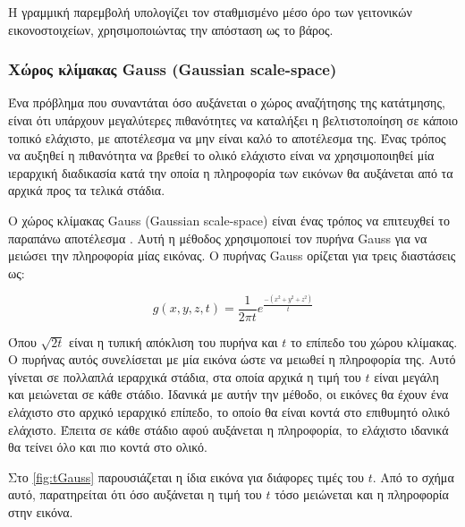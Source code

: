 \documentclass[a4paper,12pt]{article}
\begin{document}
Η γραμμική παρεμβολή υπολογίζει τον σταθμισμένο μέσο όρο των γειτονικών
εικονοστοιχείων, χρησιμοποιώντας την απόσταση ως το βάρος.

\subsubsection{Χώρος κλίμακας Gauss (Gaussian scale-space)} \label{reg:gauss:1}

Ένα πρόβλημα που συναντάται όσο αυξάνεται ο χώρος αναζήτησης της κατάτμησης,
είναι ότι υπάρχουν μεγαλύτερες πιθανότητες να καταλήξει η βελτιστοποίηση σε
κάποιο τοπικό ελάχιστο, με αποτέλεσμα να μην είναι καλό το αποτέλεσμα της. Ένας
τρόπος να αυξηθεί η πιθανότητα να βρεθεί το ολικό ελάχιστο είναι να
χρησιμοποιηθεί μία ιεραρχική διαδικασία κατά την οποία η πληροφορία των εικόνων
θα αυξάνεται από τα αρχικά προς τα τελικά στάδια. 

Ο χώρος κλίμακας Gauss (Gaussian scale-space) είναι ένας τρόπος να επιτευχθεί το
παραπάνω αποτέλεσμα \cite{scale_space:1}. Αυτή η μέθοδος χρησιμοποιεί τον πυρήνα
Gauss για να μειώσει την πληροφορία μίας εικόνας. Ο πυρήνας Gauss ορίζεται για
τρεις διαστάσεις ως:

\begin{equation} \label{gaussian_kernel:1}
    g(x,y,z,t) = \frac{1} {2 \pi t} e^{\frac{-(x^2 + y^2 + z^2) }{t}}
\end{equation}

Όπου $\sqrt{2t}$ είναι η τυπική απόκλιση του πυρήνα και $t$ το επίπεδο του χώρου
κλίμακας. Ο πυρήνας αυτός συνελίσεται με μία εικόνα ώστε να μειωθεί η πληροφορία
της. Αυτό γίνεται σε πολλαπλά ιεραρχικά στάδια, στα οποία αρχικά η τιμή του $t$
είναι μεγάλη και μειώνεται σε κάθε στάδιο. Ιδανικά με αυτήν την μέθοδο, οι
εικόνες θα έχουν ένα ελάχιστο στο αρχικό ιεραρχικό επίπεδο, το οποίο θα είναι
κοντά στο επιθυμητό ολικό ελάχιστο. Έπειτα σε κάθε στάδιο αφού αυξάνεται η
πληροφορία, το ελάχιστο ιδανικά θα τείνει όλο και πιο κοντά στο ολικό.

Στο \autoref{fig:tGauss} παρουσιάζεται η ίδια εικόνα για διάφορες τιμές του $t$.
Από το σχήμα αυτό, παρατηρείται ότι όσο αυξάνεται η τιμή του $t$ τόσο μειώνεται
και η πληροφορία στην εικόνα.
\end{document}
